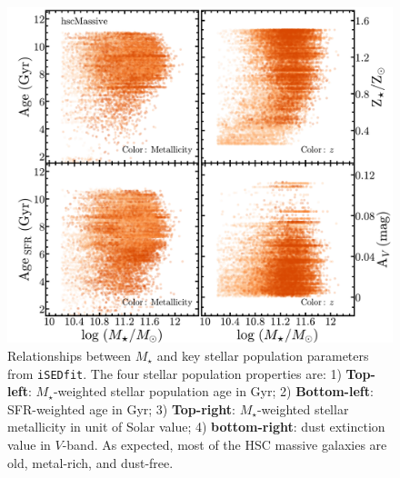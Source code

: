 \documentclass[a4paper,fleqn,usenatbib]{mnras}
\def\mstar{{$M_{\star}$}}
\begin{document}
    \begin{figure}
        \begin{center}
        \includegraphics[width=12cm]{fig/redbcg_isedfit_2.pdf}
        \caption{
            Relationships between \mstar{} and key stellar population parameters from 
            \texttt{iSEDfit}. 
            The four stellar population properties are: 
            1) \textbf{Top-left}: \mstar{}-weighted stellar population age in Gyr; 
            2) \textbf{Bottom-left}: SFR-weighted age in Gyr; 
            3) \textbf{Top-right}: \mstar{}-weighted stellar metallicity in unit of 
            Solar value;
            4) \textbf{bottom-right}: dust extinction value in $V$-band.
            As expected, most of the HSC massive galaxies are old, metal-rich, and 
            dust-free. 
            }
        \label{fig:ised_2}
        \end{center}
    \end{figure}
\end{document}
